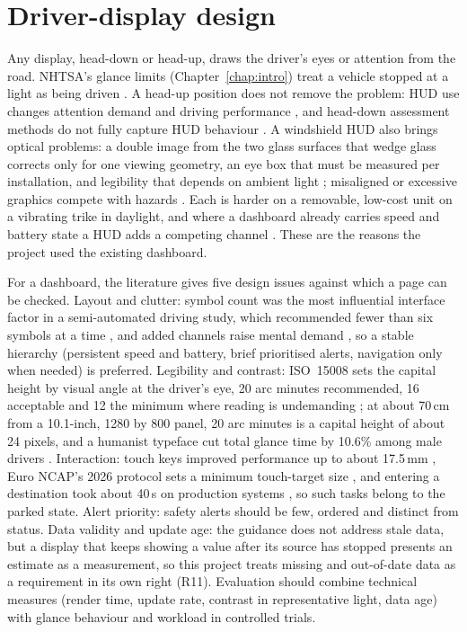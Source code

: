 \section{Driver-display design}
\label{sec:lit-display}

Any display, head-down or head-up, draws the driver's eyes or attention from the road. NHTSA's glance limits (Chapter~\ref{chap:intro}) treat a vehicle stopped at a light as being driven \cite{nhtsa2013}. A head-up position does not remove the problem: HUD use changes attention demand and driving performance \cite{liu2003}, and head-down assessment methods do not fully capture HUD behaviour \cite{smith2016}. A windshield HUD also brings optical problems: a double image from the two glass surfaces that wedge glass corrects only for one viewing geometry, an eye box that must be measured per installation, and legibility that depends on ambient light \cite{mareska2022, qin2017, hauslschmid2016}; misaligned or excessive graphics compete with hazards \cite{hauslschmid2015}. Each is harder on a removable, low-cost unit on a vibrating trike in daylight, and where a dashboard already carries speed and battery state a HUD adds a competing channel \cite{zhu2021}. These are the reasons the project used the existing dashboard.

For a dashboard, the literature gives five design issues against which a page can be checked. Layout and clutter: symbol count was the most influential interface factor in a semi-automated driving study, which recommended fewer than six symbols at a time \cite{park2020}, and added channels raise mental demand \cite{zhu2021}, so a stable hierarchy (persistent speed and battery, brief prioritised alerts, navigation only when needed) is preferred. Legibility and contrast: ISO~15008 sets the capital height by visual angle at the driver's eye, 20 arc minutes recommended, 16 acceptable and 12 the minimum where reading is undemanding \cite{iso15008}; at about 70\,cm from a 10.1-inch, 1280 by 800 panel, 20 arc minutes is a capital height of about 24 pixels, and a humanist typeface cut total glance time by 10.6\% among male drivers \cite{reimer2014typeface}. Interaction: touch keys improved performance up to about 17.5\,mm \cite{kim2014touchkey}, Euro NCAP's 2026 protocol sets a minimum touch-target size \cite{euroncap2026engagement}, and entering a destination took about 40\,s on production systems \cite{strayer2017infotainment}, so such tasks belong to the parked state. Alert priority: safety alerts should be few, ordered and distinct from status. Data validity and update age: the guidance does not address stale data, but a display that keeps showing a value after its source has stopped presents an estimate as a measurement, so this project treats missing and out-of-date data as a requirement in its own right (R11). Evaluation should combine technical measures (render time, update rate, contrast in representative light, data age) with glance behaviour and workload in controlled trials.

